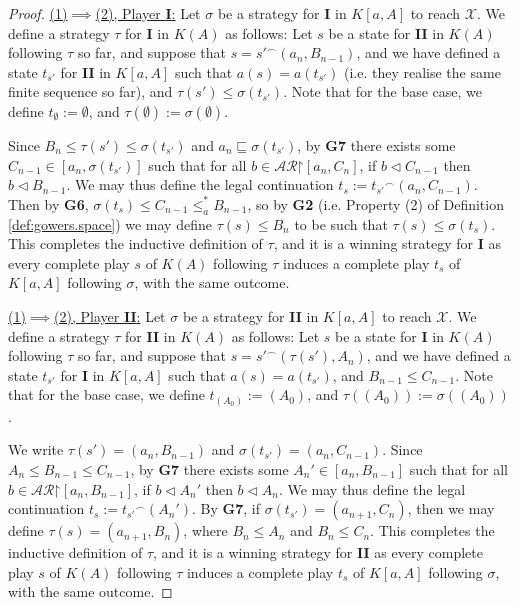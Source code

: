 \documentclass[11pt,reqno]{amsart}
\theoremstyle{plain}
\numberwithin{equation}{section}
\theoremstyle{definition}
\newcommand{\cal}{\mathcal}
\newcommand{\restrictedto}{\mathord{\upharpoonright}}
\newcommand{\X}{\cal{X}}
\begin{document}
\begin{proof}
    \underline{(1)$\implies$(2), Player \textbf{I}:} Let $\sigma$ be a strategy for \textbf{I} in $K[a,A]$ to reach $\X$. We define a strategy $\tau$ for \textbf{I} in $K(A)$ as follows: Let $s$ be a state for \textbf{II} in $K(A)$ following $\tau$ so far, and suppose that $s = {s'}^\frown(a_n,B_{n-1})$, and we have defined a state $t_{s'}$ for \textbf{II} in $K[a,A]$ such that $a(s) = a(t_{s'})$ (i.e. they realise the same finite sequence so far), and $\tau(s') \leq \sigma(t_{s'})$. Note that for the base case, we define $t_\emptyset := \emptyset$, and $\tau(\emptyset) := \sigma(\emptyset)$. 
    
    Since $B_n \leq \tau(s') \leq \sigma(t_{s'})$ and $a_n \sqsubseteq \sigma(t_{s'})$, by \textbf{G7} there exists some $C_{n-1} \in [a_n,\sigma(t_{s'})]$ such that for all $b \in \cal{AR}\restrictedto[a_n,C_n]$, if $b \lhd C_{n-1}$ then $b \lhd B_{n-1}$. We may thus define the legal continuation $t_s := {t_{s'}}^\frown(a_n,C_{n-1})$. Then by \textbf{G6}, $\sigma(t_s) \leq C_{n-1} \leq_a^* B_{n-1}$, so by \textbf{G2} (i.e. Property (2) of Definition \ref{def:gowers.space}) we may define $\tau(s) \leq B_n$ to be such that $\tau(s) \leq \sigma(t_s)$. This completes the inductive definition of $\tau$, and it is a winning strategy for \textbf{I} as every complete play $s$ of $K(A)$ following $\tau$ induces a complete play $t_s$ of $K[a,A]$ following $\sigma$, with the same outcome.

     \underline{(1)$\implies$(2), Player \textbf{II}:} Let $\sigma$ be a strategy for \textbf{II} in $K[a,A]$ to reach $\X$. We define a strategy $\tau$ for \textbf{II} in $K(A)$ as follows: Let $s$ be a state for \textbf{I} in $K(A)$ following $\tau$ so far, and suppose that $s = {s'}^\frown(\tau(s'),A_n)$, and we have defined a state $t_{s'}$ for \textbf{I} in $K[a,A]$ such that $a(s) = a(t_{s'})$, and $B_{n-1} \leq C_{n-1}$. Note that for the base case, we define $t_{(A_0)} := (A_0)$, and $\tau((A_0)) := \sigma((A_0))$.

     We write $\tau(s') = (a_n,B_{n-1})$ and $\sigma(t_{s'}) = (a_n,C_{n-1})$. Since $A_n \leq B_{n-1} \leq C_{n-1}$, by \textbf{G7} there exists some $A_n' \in [a_n,B_{n-1}]$ such that for all $b \in \cal{AR}\restrictedto[a_n,B_{n-1}]$, if $b \lhd A_n'$ then $b \lhd A_n$. We may thus define the legal continuation $t_s := {t_{s'}}^\frown(A_n')$. By \textbf{G7}, if $\sigma(t_{s'}) = (a_{n+1},C_n)$, then we may define $\tau(s) = (a_{n+1},B_n)$, where $B_n \leq A_n$ and $B_n \leq C_n$. This completes the inductive definition of $\tau$, and it is a winning strategy for \textbf{II} as every complete play $s$ of $K(A)$ following $\tau$ induces a complete play $t_s$ of $K[a,A]$ following $\sigma$, with the same outcome.


\end{proof}
\end{document}
